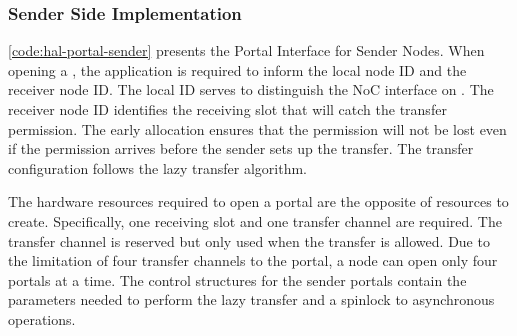 			\subsubsection{Sender Side Implementation}



				\autoref{code:hal-portal-sender} presents the Portal Interface for
				Sender Nodes. When opening a \portal, the application is required to
				inform the local node ID and the receiver node ID. The local ID serves
				to distinguish the NoC interface on \ioclusters. The receiver node ID
				identifies the \cnoc receiving slot that will catch the transfer
				permission. The early allocation ensures that the permission will not
				be lost even if the permission arrives before the sender sets up the
				transfer. The transfer configuration follows the lazy transfer algorithm.

				The hardware resources required to open a portal are the opposite of
				resources to create. Specifically, one \cnoc receiving slot and one
				\dnoc transfer channel are required. The transfer channel is reserved
				but only used when the transfer is allowed. Due to the limitation of
				four transfer channels to the portal, a node can open only four portals
				at a time. The control structures for the sender portals contain the
				parameters needed to perform the lazy transfer and a spinlock to
				asynchronous operations.

